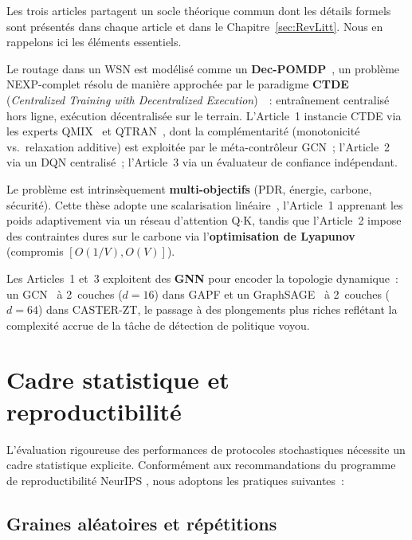 Les trois articles partagent un socle théorique commun dont les détails formels sont présentés dans chaque article et dans le Chapitre~\ref{sec:RevLitt}. Nous en rappelons ici les éléments essentiels.

Le routage dans un WSN est modélisé comme un \textbf{Dec-POMDP}~\cite{Bernstein2002DecPOMDP, OliehoekAmato2016}, un problème NEXP-complet résolu de manière approchée par le paradigme \textbf{CTDE} (\emph{Centralized Training with Decentralized Execution})~\cite{OliehoekAmato2016}~: entraînement centralisé hors ligne, exécution décentralisée sur le terrain. L'Article~1 instancie CTDE via les experts QMIX~\cite{rashid2018qmix} et QTRAN~\cite{son2019qtran}, dont la complémentarité (monotonicité vs.\ relaxation additive) est exploitée par le méta-contrôleur GCN~; l'Article~2 via un DQN centralisé~; l'Article~3 via un évaluateur de confiance indépendant.

Le problème est intrinsèquement \textbf{multi-objectifs} (PDR, énergie, carbone, sécurité). Cette thèse adopte une scalarisation linéaire~\cite{Hayes2022MOMARL}, l'Article~1 apprenant les poids adaptivement via un réseau d'attention Q$\cdot$K, tandis que l'Article~2 impose des contraintes dures sur le carbone via l'\textbf{optimisation de Lyapunov}~\cite{neely2010lyapunov} (compromis $[O(1/V), O(V)]$).

Les Articles~1 et~3 exploitent des \textbf{GNN} pour encoder la topologie dynamique~: un GCN~\cite{kipf2017semi} à 2~couches ($d = 16$) dans GAPF et un GraphSAGE~\cite{hamilton2017graphsage} à 2~couches ($d = 64$) dans CASTER-ZT, le passage à des plongements plus riches reflétant la complexité accrue de la tâche de détection de politique voyou.


\section{Cadre statistique et reproductibilité}\label{sec:demarche-stats}

L'évaluation rigoureuse des performances de protocoles stochastiques nécessite un cadre statistique explicite. Conformément aux recommandations du programme de reproductibilité NeurIPS \cite{Pineau2021Reproducibility}, nous adoptons les pratiques suivantes~:

\subsection{Graines aléatoires et répétitions}

